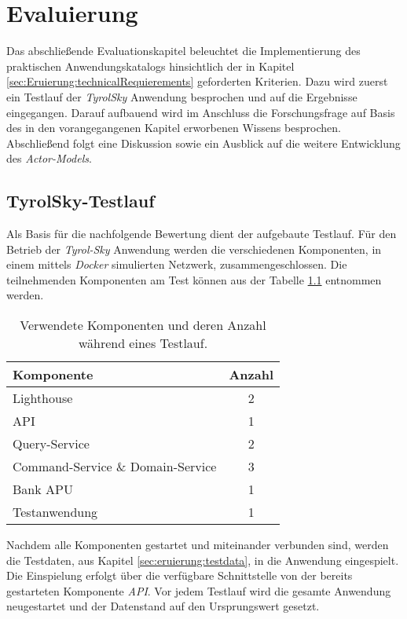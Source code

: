 \chapter{Evaluierung} \label{cha:evaluation}
Das abschließende Evaluationskapitel beleuchtet die Implementierung des praktischen Anwendungskatalogs hinsichtlich der in Kapitel \ref{sec:Eruierung:technicalRequierements} geforderten Kriterien. Dazu wird zuerst ein Testlauf der \textit{TyrolSky} Anwendung besprochen und auf die Ergebnisse eingegangen. Darauf aufbauend wird im Anschluss die Forschungsfrage auf Basis des in den vorangegangenen Kapitel erworbenen Wissens besprochen. Abschließend folgt eine Diskussion sowie ein Ausblick auf die weitere Entwicklung des \textit{Actor-Models}. 
% 
% 

\section{TyrolSky-Testlauf}
Als Basis für die nachfolgende Bewertung dient der aufgebaute Testlauf. Für den Betrieb der \textit{Tyrol-Sky} Anwendung werden die verschiedenen Komponenten, in einem mittels \textit{Docker} simulierten Netzwerk, zusammengeschlossen. Die teilnehmenden Komponenten am Test können aus der Tabelle \ref{tab:evaluation:testStage} entnommen werden. \\
\begin{table}
    \centering
    \begin{tabular}{lc}
        Komponente       &   Anzahl  \\ \hline
        Lighthouse       &   2       \\
        API              &   1       \\
        Query-Service    &   2       \\
        Command-Service \& Domain-Service  &   3       \\
        Bank APU         &   1       \\
        Testanwendung    &   1
    \end{tabular}
    \caption{Verwendete Komponenten und deren Anzahl während eines Testlauf.}
    \label{tab:evaluation:testStage}
\end{table}
Nachdem alle Komponenten gestartet und miteinander verbunden sind, werden die Testdaten, aus Kapitel \ref{sec:eruierung:testdata}, in die Anwendung eingespielt. Die Einspielung erfolgt über die verfügbare Schnittstelle von der bereits gestarteten Komponente \textit{API}. Vor jedem Testlauf wird die gesamte Anwendung neugestartet und der Datenstand auf den Ursprungswert gesetzt. \\

